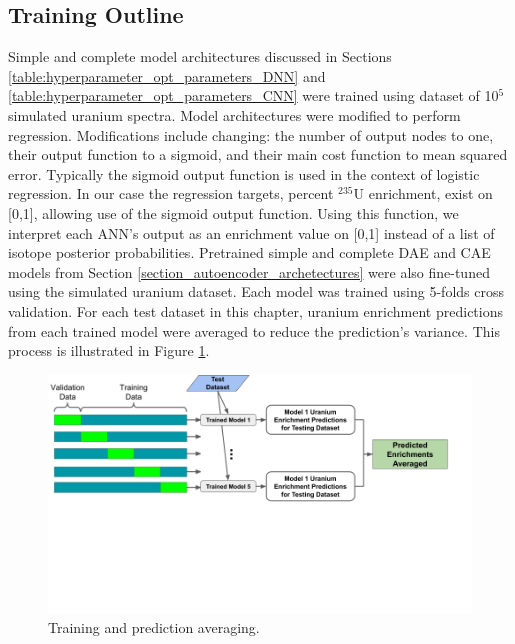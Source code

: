 
\subsection{Training Outline}

Simple and complete model architectures discussed in Sections \ref{table:hyperparameter_opt_parameters_DNN} and \ref{table:hyperparameter_opt_parameters_CNN} were trained using dataset of 10$^{5}$ simulated uranium spectra. Model architectures were modified to perform regression. Modifications include changing: the number of output nodes to one, their output function to a sigmoid, and their main cost function to mean squared error. Typically the sigmoid output function is used in the context of logistic regression. In our case the regression targets, percent $^{235}$U enrichment, exist on [0,1], allowing use of the sigmoid output function. Using this function, we interpret each ANN's output as an enrichment value on [0,1] instead of a list of isotope posterior probabilities. Pretrained simple and complete DAE and CAE models from Section \ref{section_autoencoder_archetectures} were also fine-tuned using the simulated uranium dataset. Each model was trained using 5-folds cross validation. For each test dataset in this chapter, uranium enrichment predictions from each trained model were averaged to reduce the prediction's variance. This process is illustrated in Figure \ref{fig:uenrich_training_outline}.

\begin{figure}[H]
	\centering
	\includegraphics[trim=0 250 40 0,clip,width=1.0\linewidth]{images/uenrich_training_outline}
	\caption{Training and prediction averaging.}
	\label{fig:uenrich_training_outline}
\end{figure}

